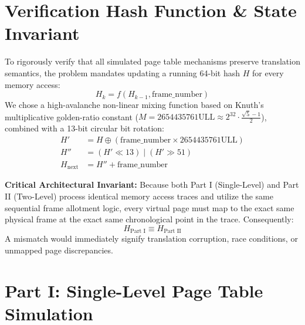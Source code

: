 \documentclass[11pt,a4paper]{article}
\begin{document}
\section{Verification Hash Function \& State Invariant}

To rigorously verify that all simulated page table mechanisms preserve translation semantics, the problem mandates updating a running 64-bit hash $H$ for every memory access:
\begin{equation}
    H_{k} = f(H_{k-1}, \text{frame\_number})
\end{equation}
We chose a high-avalanche non-linear mixing function based on Knuth's multiplicative golden-ratio constant ($M = 2654435761\text{ULL} \approx 2^{32} \cdot \frac{\sqrt{5}-1}{2}$), combined with a 13-bit circular bit rotation:
\begin{equation}
    \begin{aligned}
        H' &= H \oplus (\text{frame\_number} \times 2654435761\text{ULL}) \\
        H'' &= (H' \ll 13) \mid (H' \gg 51) \\
        H_{\text{next}} &= H'' + \text{frame\_number}
    \end{aligned}
\end{equation}

\noindent\textbf{Critical Architectural Invariant:}
Because both Part I (Single-Level) and Part II (Two-Level) process identical memory access traces and utilize the same sequential frame allotment logic, every virtual page must map to the exact same physical frame at the exact same chronological point in the trace. Consequently:
\begin{equation}
    H_{\text{Part I}} \equiv H_{\text{Part II}}
\end{equation}
A mismatch would immediately signify translation corruption, race conditions, or unmapped page discrepancies.

\section{Part I: Single-Level Page Table Simulation}
\end{document}
